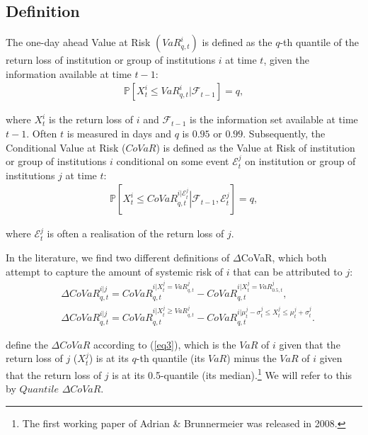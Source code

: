 \documentclass[12pt]{article}
\begin{document}

\subsection{Definition} \label{2def}

The one-day ahead Value at Risk $\left(VaR^i_{q,t}\right)$ is defined as the $q$-th quantile of the return loss of institution or group of institutions $i$ at time $t$, given the information available at time $t-1$:
\begin{align}
\mathbb{P}\left[X^{i}_t\leq VaR_{q,t}^{i}\left| \mathcal{F}_{t-1}\right.\right]=q ,
\end{align}

\noindent where $X^{i}_t$ is the return loss of $i$ and $\mathcal{F}_{t-1}$ is the information set available at time $t-1$. Often $t$ is measured in days and $q$ is $0.95$ or $0.99$. Subsequently, the Conditional Value at Risk ($CoVaR$) is defined as the Value at Risk of institution or group of institutions $i$ conditional on some event $\mathcal{E}^j_t$ on institution or group of institutions $j$ at time $t$:
\begin{align}
\mathbb{P}\left[X^{i}_t\leq CoVaR_{q,t}^{i|\mathcal{E}^j_t}\left|\mathcal{F}_{t-1},\mathcal{E}^j_t\right.\right]=q ,
\end{align}

\noindent where $\mathcal{E}^j_t$ is often a realisation of the return loss of $j$.

In the literature, we find two different definitions of $\Delta$CoVaR, which both attempt to capture the amount of systemic risk of $i$ that can be attributed to $j$:
\begin{align}
& \Delta CoVaR^{i|j}_{q,t}=CoVaR_{q,t}^{i|X^{j}_t=VaR_{q,t}^{j}}-CoVaR_{q,t}^{i|X^{j}_t=VaR_{0.5,t}^{j}} , \label{eq3} \\
& \Delta CoVaR^{i|j}_{q,t}=CoVaR_{q,t}^{i|X^{j}_t\geq VaR_{q,t}^{j}}-CoVaR_{q,t}^{i|\mu^j_t-\sigma^j_t \leq X^{j}_t \leq \mu^j_t+\sigma^j_t }  . \label{eq4}
\end{align}

\noindent \citet{adrian} define the $\Delta CoVaR$ according to (\ref{eq3}), which is the $VaR$ of $i$ given that the return loss of $j$ ($X^j_t$) is at its $q$-th quantile (its $VaR$) minus the $VaR$ of $i$ given that the return loss of $j$ is at its 0.5-quantile (its median).\footnote{The first working paper of Adrian \& Brunnermeier was released in 2008.} We will refer to this by $Quantile$ $\Delta CoVaR$.
\end{document}
